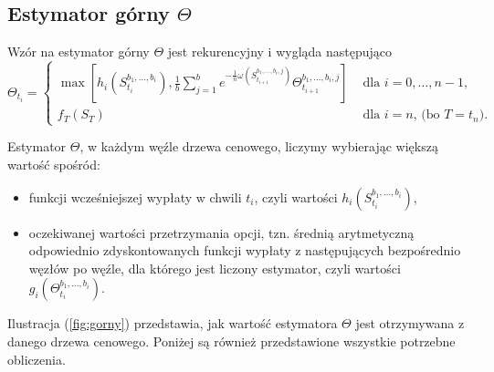 \documentclass[]{pwr_wmat_praca_dyplomowa}
\theoremstyle{plain}
\numberwithin{theorem}{chapter}
\theoremstyle{definition}
\numberwithin{theorem}{chapter}
\begin{document}
\subsection{Estymator górny $\Theta$}

Wzór na estymator górny $\Theta$ jest rekurencyjny i wygląda następująco
\begin{equation}
\label{eq:gorny}
\Theta_{t_i} = \left\{ \begin{array}{ll}
\max [h_i(S_{t_i}^{b_1,\ldots, b_i}), \frac{1}{b}\sum_{j=1}^b e^{-\frac{1}{n}\omega(S_{t_{i+1}}^{b_1,\ldots,b_i,j})}\Theta_{t_{i+1}}^{b_1,\ldots, b_i,j}] & \textrm{ dla } i=0,\ldots,n-1,\\
 f_{T}(S_{T}) & \textrm{ dla } i=n \textrm{, (bo }T = t_n).
\end{array} \right.
\end{equation}

\noindent Estymator $\Theta$, w każdym węźle drzewa cenowego, liczymy wybierając większą wartość spośród:
\begin{itemize}
\item funkcji wcześniejszej wypłaty w chwili $t_i$, czyli wartości $h_i(S_{t_i}^{b_1,\ldots,b_i})$,
\item oczekiwanej wartości przetrzymania opcji, tzn. średnią arytmetyczną odpowiednio zdyskontowanych funkcji wypłaty z następujących bezpośrednio węzłów po węźle, dla którego jest liczony estymator, czyli wartości $g_i(\Theta_{t_i}^{b_1,\ldots,b_i})$.
\end{itemize}
Ilustracja (\ref{fig:gorny}) przedstawia, jak wartość estymatora $\Theta$ jest otrzymywana z danego drzewa cenowego. Poniżej są również przedstawione wszystkie potrzebne obliczenia.
\end{document}
